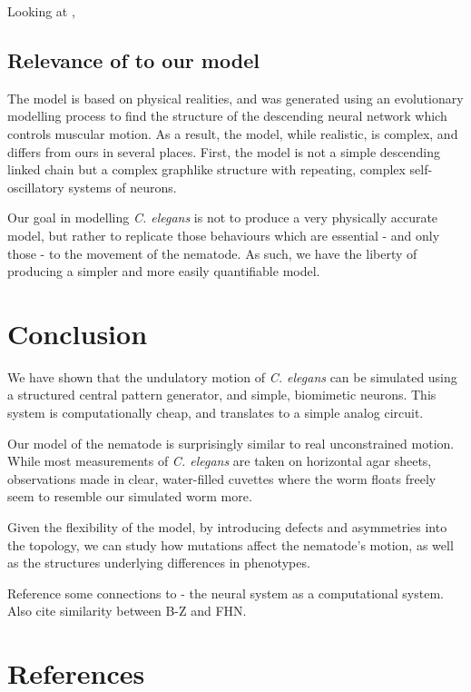 \documentclass[
    11pt,
]{article}
\begin{document}
Looking at ,

\subsection{Relevance of \citet{izquierdo2018} to our model}

The \citet{izquierdo2018} model is based on physical realities, and was generated using an evolutionary modelling process to find the structure of the descending neural network which controls muscular motion.  As a result, the model, while realistic, is complex, and differs from ours in several places.  First, the model is not a simple descending linked chain but a complex graphlike structure with repeating, complex self-oscillatory systems of neurons.

Our goal in modelling \emph{C. elegans} is not to produce a very physically accurate model, but rather to replicate those behaviours which are essential - and only those - to the movement of the nematode.  As such, we have the liberty of producing a simpler and more easily quantifiable model.

\section{Conclusion}

We have shown that the undulatory motion of \emph{C. elegans} can be simulated using a structured central pattern generator, and simple, biomimetic neurons.  This system is computationally cheap, and translates to a simple analog circuit.

Our model of the nematode is surprisingly similar to real unconstrained motion.  While most measurements of \emph{C. elegans} are taken on horizontal agar sheets, observations made in clear, water-filled cuvettes where the worm floats freely seem to resemble our simulated worm more.

Given the flexibility of the model, by introducing defects and asymmetries into the topology, we can study how mutations affect the nematode's motion, as well as the structures underlying differences in phenotypes.


Reference some connections to \citet{adamatzky2008} - the neural system as a computational system.  Also cite similarity between B-Z and FHN.

\section{References}

% 
\printbibliography[heading=none]
\end{document}
